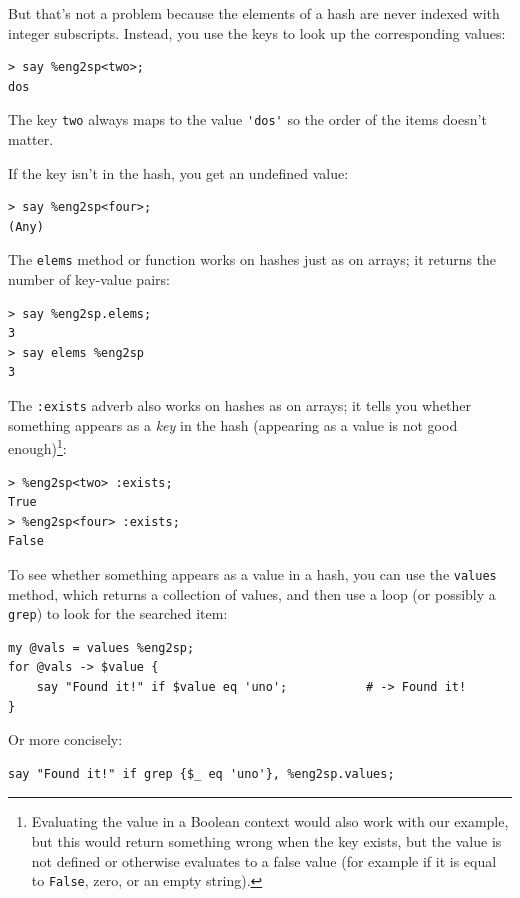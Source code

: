 But that's not a problem because the elements of a hash 
are never indexed with integer subscripts. Instead, you use 
the keys to look up the corresponding values:

\begin{verbatim}
> say %eng2sp<two>;
dos
\end{verbatim}
%
The key \verb"two" always maps to the value \verb"'dos'" 
so the order of the items doesn't matter.

If the key isn't in the hash, you get an undefined value:

\begin{verbatim}
> say %eng2sp<four>;
(Any)
\end{verbatim}
%
The {\tt elems} method or function works on hashes just 
as on arrays; it returns the number of key-value pairs:


\begin{verbatim}
> say %eng2sp.elems;
3
> say elems %eng2sp
3
\end{verbatim}
%
The {\tt :exists} adverb also works on hashes as on 
arrays; it tells you whether something appears as 
a {\em key} in the hash (appearing as a value is not 
good enough)\footnote{Evaluating the value in a Boolean 
context would also work with our example, but this would 
return something wrong when the key exists, but the value 
is not defined or otherwise evaluates to a false value 
(for example if it is equal to {\tt False}, zero, or 
an empty string).}:

\begin{verbatim}
> %eng2sp<two> :exists;
True
> %eng2sp<four> :exists;
False
\end{verbatim}
%
To see whether something appears as a value in a hash, you
can use the {\tt values} method, which returns a collection of
values, and then use a loop (or possibly a {\tt grep}) to 
look for the searched item:

\begin{verbatim}
my @vals = values %eng2sp;
for @vals -> $value {
    say "Found it!" if $value eq 'uno';           # -> Found it!
}
\end{verbatim}
%
Or more concisely:
\begin{verbatim}
say "Found it!" if grep {$_ eq 'uno'}, %eng2sp.values;
\end{verbatim}

